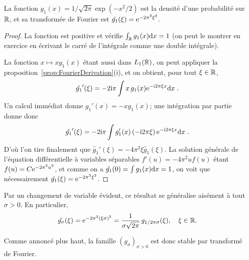 \begin{lemma}\label{lem:gaussenneTF}
La fonction  $g_1(x)= 1 / \sqrt{2\pi} \exp( -x^2/2)$ est la densit{\'e} d'une probabilit{\'e} sur $\mathbb{R}$, et sa transform{\'e}e de Fourier
est $\hat{g_1}(\xi)= \mathrm{e}^{- 2 \pi^2 \xi^2}$.
\end{lemma}
\begin{proof}
La fonction  est positive et v{\'e}rifie  $\int_{\mathbb{R}} g_1(x) \mathrm{d} x= 1$ (on peut le montrer en exercice en {\'e}crivant le carr{\'e} de
l'int{\'e}grale comme une double int{\'e}grale).

La fonction $x\mapsto xg_1(x)$ {\'e}tant aussi dans $L_1(\mathbb{R})$, on peut appliquer la
proposition~\ref{prop:FourierDerivation}(i), et on obtient, pour tout $\xi\in\mathbb{R}$,
$$
\hat{g_1}'(\xi) = - 2\mathrm{i} \pi \int x \,g_1(x) \mathrm{e}^{- \mathrm{i} 2 \pi \xi x} \mathrm{d} x \;.
$$
Un calcul imm{\'e}diat donne $g_1'(x)= -xg_1(x)$; une int{\'e}gration par partie donne donc
$$
\hat{g_1}'(\xi) = - 2\mathrm{i} \pi  \int g_1'(x) \,(- \mathrm{i} 2 \pi \xi)\,\mathrm{e}^{- \mathrm{i} 2 \pi \xi x} \mathrm{d} x \;.
$$
D'o{\`u} l'on tire finalement que $\hat{g}_1'(\xi) = - 4 \pi^2 \xi \hat{g}_1(\xi)$.
La solution g{\'e}n{\'e}rale de l'{\'e}quation diff{\'e}rentielle {\`a} variables s{\'e}parables  $f'(u)= - 4 \pi^2 u f(u)$
{\'e}tant $f(u) = C \mathrm{e}^{- 2 \pi^2 u^2}$, et comme on a  $\hat{g_1}(0) = \int g_1(x) \mathrm{d} x = 1$,
on voit que n{\'e}cessairement $\hat{g_1}(\xi)= \mathrm{e}^{-2 \pi^2 \xi^2}$.
\end{proof}

Par un changement de variable {\'e}vident, ce r{\'e}sultat se g{\'e}n{\'e}ralise ais{\'e}ment {\`a} tout $\sigma>0$. En particulier,
\begin{equation}\label{eq:gaussienneTF}
\hat{g_\sigma}(\xi) =  \mathrm{e}^{-2 \pi^2 (\xi\sigma)^2} = \frac1{\sigma\sqrt{2\pi}}\,g_{1/2\pi\sigma}(\xi),\quad\xi\in\mathbb{R}.
\end{equation}

Comme annonc\'e plus haut, la famille $(g_\sigma)_{\sigma>0}$ est donc stable par
transform{\'e} de Fourier.
